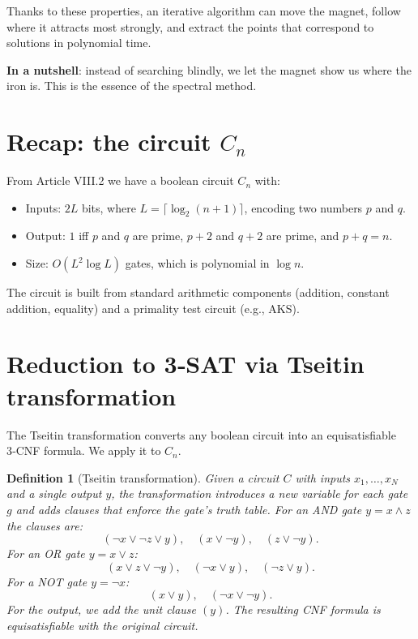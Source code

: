 \documentclass[11pt,a4paper]{article}
\newtheorem{definition}[theorem]{Definition}
\begin{document}
Thanks to these properties, an iterative algorithm can move the magnet, follow where it attracts most strongly, and extract the points that correspond to solutions in polynomial time.

\textbf{In a nutshell}: instead of searching blindly, we let the magnet show us where the iron is. This is the essence of the spectral method.

\section{Recap: the circuit \(C_n\)}

From Article VIII.2 we have a boolean circuit \(C_n\) with:
\begin{itemize}
\item Inputs: \(2L\) bits, where \(L = \lceil \log_2 (n+1)\rceil\), encoding two numbers \(p\) and \(q\).
\item Output: \(1\) iff \(p\) and \(q\) are prime, \(p+2\) and \(q+2\) are prime, and \(p+q=n\).
\item Size: \(O(L^2 \log L)\) gates, which is polynomial in \(\log n\).
\end{itemize}
The circuit is built from standard arithmetic components (addition, constant addition, equality) and a primality test circuit (e.g., AKS).

\section{Reduction to 3‑SAT via Tseitin transformation}

The Tseitin transformation converts any boolean circuit into an equisatisfiable 3‑CNF formula. We apply it to \(C_n\).

\begin{definition}[Tseitin transformation]
Given a circuit \(C\) with inputs \(x_1,\dots,x_N\) and a single output \(y\), the transformation introduces a new variable for each gate \(g\) and adds clauses that enforce the gate’s truth table. For an AND gate \(y = x \land z\) the clauses are:
\[
(\neg x \lor \neg z \lor y),\quad (x \lor \neg y),\quad (z \lor \neg y).
\]
For an OR gate \(y = x \lor z\):
\[
(x \lor z \lor \neg y),\quad (\neg x \lor y),\quad (\neg z \lor y).
\]
For a NOT gate \(y = \neg x\):
\[
(x \lor y),\quad (\neg x \lor \neg y).
\]
For the output, we add the unit clause \((y)\). The resulting CNF formula is equisatisfiable with the original circuit.
\end{definition}
\end{document}
